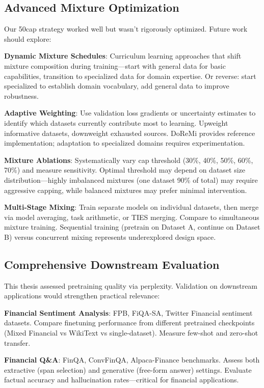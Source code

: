 \subsection{Advanced Mixture Optimization}

Our 50cap strategy worked well but wasn't rigorously optimized. Future work should explore:

\textbf{Dynamic Mixture Schedules}: Curriculum learning approaches that shift mixture composition during training—start with general data for basic capabilities, transition to specialized data for domain expertise. Or reverse: start specialized to establish domain vocabulary, add general data to improve robustness.

\textbf{Adaptive Weighting}: Use validation loss gradients or uncertainty estimates to identify which datasets currently contribute most to learning. Upweight informative datasets, downweight exhausted sources. DoReMi \parencite{doremi2023} provides reference implementation; adaptation to specialized domains requires experimentation.

\textbf{Mixture Ablations}: Systematically vary cap threshold (30\%, 40\%, 50\%, 60\%, 70\%) and measure sensitivity. Optimal threshold may depend on dataset size distribution—highly imbalanced mixtures (one dataset 90\% of total) may require aggressive capping, while balanced mixtures may prefer minimal intervention.

\textbf{Multi-Stage Mixing}: Train separate models on individual datasets, then merge via model averaging, task arithmetic, or TIES merging. Compare to simultaneous mixture training. Sequential training (pretrain on Dataset A, continue on Dataset B) versus concurrent mixing represents underexplored design space.

\subsection{Comprehensive Downstream Evaluation}

This thesis assessed pretraining quality via perplexity. Validation on downstream applications would strengthen practical relevance:

\textbf{Financial Sentiment Analysis}: FPB, FiQA-SA, Twitter Financial sentiment datasets. Compare finetuning performance from different pretrained checkpoints (Mixed Financial vs WikiText vs single-dataset). Measure few-shot and zero-shot transfer.

\textbf{Financial Q\&A}: FinQA, ConvFinQA, Alpaca-Finance benchmarks. Assess both extractive (span selection) and generative (free-form answer) settings. Evaluate factual accuracy and hallucination rates—critical for financial applications.

